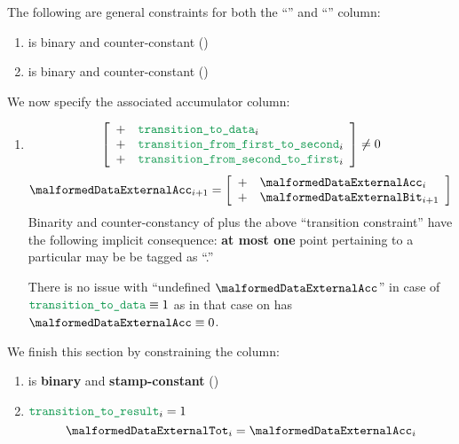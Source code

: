 The following are general constraints for both the ``'' and ``'' column:
\begin{enumerate}[resume]
    \item \malformedDataExternalBit{} is binary and counter-constant \quad (\trash)
    \item \malformedDataExternalAcc{} is binary and counter-constant \quad (\trash)
\end{enumerate}
We now specify the associated accumulator column:
\begin{enumerate}[resume]
    \item \If
        \[
            \left[ \begin{array}{cl}
                + & \locTransitionToData            _{i} \\
                + & \locTransitionFromFirstToSecond _{i} \\
                + & \locTransitionFromSecondToFirst _{i} \\
            \end{array} \right]
            \neq 0
        \]
        \Then
        \[
            \malformedDataExternalAcc _{i + 1} =
            \left[ \begin{array}{cl}
                + & \malformedDataExternalAcc _{i}     \\
                + & \malformedDataExternalBit _{i + 1} \\
            \end{array} \right]
        \]
        \saNote{}
        Binarity and counter-constancy of \malformedDataExternalAcc{}
        plus the above ``transition constraint''
        have the following implicit consequence:
        \textbf{at most one} point pertaining to a particular \blsId{} may be be tagged as ``\malformedDataExternalBit.''

        \saNote{}
        There is no issue with ``undefined $\malformedDataExternalAcc$'' in case of $\locTransitionToData \equiv 1$
        as in that case on has $\malformedDataExternalAcc \equiv 0$.
\end{enumerate}
We finish this section by constraining the \malformedDataExternalTot{} column:
\begin{enumerate}[resume]
    \item \malformedDataExternalTot{} is \textbf{binary} and \textbf{stamp-constant} \quad (\trash)
    \item \If $\locTransitionToResult_{i} = 1$ \Then
        \[
            \malformedDataExternalTot_{i} = \malformedDataExternalAcc _{i}
        \]
\end{enumerate}
